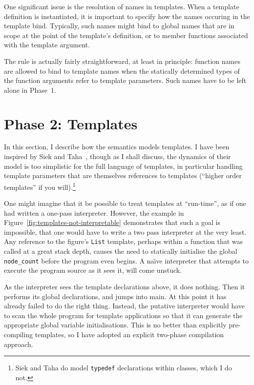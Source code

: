 \documentclass[11pt]{article}
\newcommand{\naive}{na\"\i{}ve}
\begin{document}
One significant issue is the resolution of names in templates.  When a
template definition is instantiated, it is important to specify how
the names occuring in the template bind.  Typically, such names might
bind to global names that are in scope at the point of the template's
definition, or to member functions associated with the template
argument.

The rule is actually fairly straightforward, at least in principle:
function names are allowed to bind to template names when the
statically determined types of the function arguments refer to
template parameters.  Such names have to be left alone in Phase~1.



\section{Phase 2: Templates}

\label{sec:templates}

In this section, I describe how the semantics models templates.  I
have been inspired by Siek and Taha~\cite{DBLP:conf/ecoop/SiekT06},
though as I shall discuss, the dynamics of their model is too
simplistic for the full language of templates, in particular handling
template parameters that are themselves references to templates
(``higher order templates'' if you will).\footnote{Siek and Taha do
  model \texttt{typedef} declarations within classes, which I do not.}

One might imagine that it be possible to treat templates at
``run-time'', as if one had written a one-pass \cpp{} interpreter.
However, the example in Figure~\ref{fig:templates-not-interpretable}
demonstrates that such a goal is impossible, that one would have to
write a two pass interpreter at the very least.  Any reference to the
figure's \texttt{List} template, perhaps within a function that was
called at a great stack depth, causes the need to statically
initialise the global \texttt{node\_count} before the program even
begins.  A \naive{} interpreter that attempts to execute the program
source as it sees it, will come unstuck.

As the interpreter sees the template declarations above, it does
nothing.  Then it performs its global declarations, and jumps into
main.  At this point it has already failed to do the right thing.
Instead, the putative interpreter would have to scan the whole program
for template applications so that it can generate the appropriate
global variable initialisations.  This is no better than explicitly
pre-compiling templates, so I have adopted an explicit two-phase
compilation approach.
\end{document}
